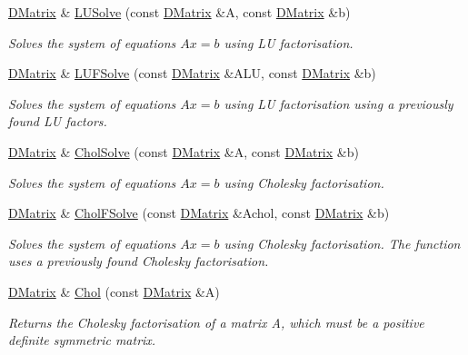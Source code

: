\begin{DoxyCompactItemize}
\hyperlink{classDMatrix}{DMatrix} \& \hyperlink{classDMatrix_aebb97348d6f64a5a77e6b0a5bcfa3afb}{LUSolve} (const \hyperlink{classDMatrix}{DMatrix} \&A, const \hyperlink{classDMatrix}{DMatrix} \&b)
\begin{DoxyCompactList}\small\item\em Solves the system of equations $ A x = b $ using LU factorisation. \item\end{DoxyCompactList}\item 
\hyperlink{classDMatrix}{DMatrix} \& \hyperlink{classDMatrix_ad9133e1f6215a490287e1f0b262c5212}{LUFSolve} (const \hyperlink{classDMatrix}{DMatrix} \&ALU, const \hyperlink{classDMatrix}{DMatrix} \&b)
\begin{DoxyCompactList}\small\item\em Solves the system of equations $ A x = b $ using LU factorisation using a previously found LU factors. \item\end{DoxyCompactList}\item 
\hyperlink{classDMatrix}{DMatrix} \& \hyperlink{classDMatrix_a0167e219388b005d7b41ea3403191fd3}{CholSolve} (const \hyperlink{classDMatrix}{DMatrix} \&A, const \hyperlink{classDMatrix}{DMatrix} \&b)
\begin{DoxyCompactList}\small\item\em Solves the system of equations $ A x = b $ using Cholesky factorisation. \item\end{DoxyCompactList}\item 
\hyperlink{classDMatrix}{DMatrix} \& \hyperlink{classDMatrix_ae5b99d9b1b937f38054ac8d16237b1c2}{CholFSolve} (const \hyperlink{classDMatrix}{DMatrix} \&Achol, const \hyperlink{classDMatrix}{DMatrix} \&b)
\begin{DoxyCompactList}\small\item\em Solves the system of equations $ A x = b $ using Cholesky factorisation. The function uses a previously found Cholesky factorisation. \item\end{DoxyCompactList}\item 
\hyperlink{classDMatrix}{DMatrix} \& \hyperlink{classDMatrix_a1266502a32517e157a8a56a312e13b54}{Chol} (const \hyperlink{classDMatrix}{DMatrix} \&A)
\begin{DoxyCompactList}\small\item\em Returns the Cholesky factorisation of a matrix A, which must be a positive definite symmetric matrix. \item\end{DoxyCompactList}\item 

\end{DoxyCompactItemize}
